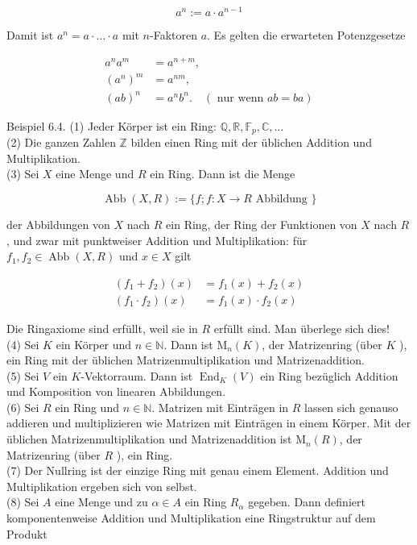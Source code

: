 \documentclass[10pt, letterpaper]{article}
\begin{document}
$$
a^{n}:=a \cdot a^{n-1}
$$

Damit ist $a^{n}=a \cdot \ldots \cdot a$ mit $n$-Faktoren $a$. Es gelten die erwarteten Potenzgesetze

$$
\begin{aligned}
a^{n} a^{m} & =a^{n+m}, \\
\left(a^{n}\right)^{m} & =a^{n m}, \\
(a b)^{n} & =a^{n} b^{n} . \quad(\text { nur wenn } a b=b a)
\end{aligned}
$$

Beispiel 6.4. (1) Jeder Körper ist ein Ring: $\mathbb{Q}, \mathbb{R}, \mathbb{F}_{p}, \mathbb{C}, \ldots$\\
(2) Die ganzen Zahlen $\mathbb{Z}$ bilden einen Ring mit der üblichen Addition und Multiplikation.\\
(3) Sei $X$ eine Menge und $R$ ein Ring. Dann ist die Menge

$$
\operatorname{Abb}(X, R):=\{f ; f: X \rightarrow R \text { Abbildung }\}
$$

der Abbildungen von $X$ nach $R$ ein Ring, der Ring der Funktionen von $X$ nach $R$, und zwar mit punktweiser Addition und Multiplikation: für $f_{1}, f_{2} \in \operatorname{Abb}(X, R)$ und $x \in X$ gilt

$$
\begin{aligned}
\left(f_{1}+f_{2}\right)(x) & =f_{1}(x)+f_{2}(x) \\
\left(f_{1} \cdot f_{2}\right)(x) & =f_{1}(x) \cdot f_{2}(x)
\end{aligned}
$$

Die Ringaxiome sind erfüllt, weil sie in $R$ erfüllt sind. Man überlege sich dies!\\
(4) Sei $K$ ein Körper und $n \in \mathbb{N}$. Dann ist $\mathrm{M}_{n}(K)$, der Matrizenring (über $K$ ), ein Ring mit der üblichen Matrizenmultiplikation und Matrizenaddition.\\
(5) Sei $V$ ein $K$-Vektorraum. Dann ist $\operatorname{End}_{K}(V)$ ein Ring bezüglich Addition und Komposition von linearen Abbildungen.\\
(6) Sei $R$ ein Ring und $n \in \mathbb{N}$. Matrizen mit Einträgen in $R$ lassen sich genauso addieren und multiplizieren wie Matrizen mit Einträgen in einem Körper. Mit der üblichen Matrizenmultiplikation und Matrizenaddition ist $\mathrm{M}_{n}(R)$, der Matrizenring (über $R$ ), ein Ring.\\
(7) Der Nullring ist der einzige Ring mit genau einem Element. Addition und Multiplikation ergeben sich von selbst.\\
(8) Sei $A$ eine Menge und zu $\alpha \in A$ ein Ring $R_{\alpha}$ gegeben. Dann definiert komponentenweise Addition und Multiplikation eine Ringstruktur auf dem Produkt
\end{document}
